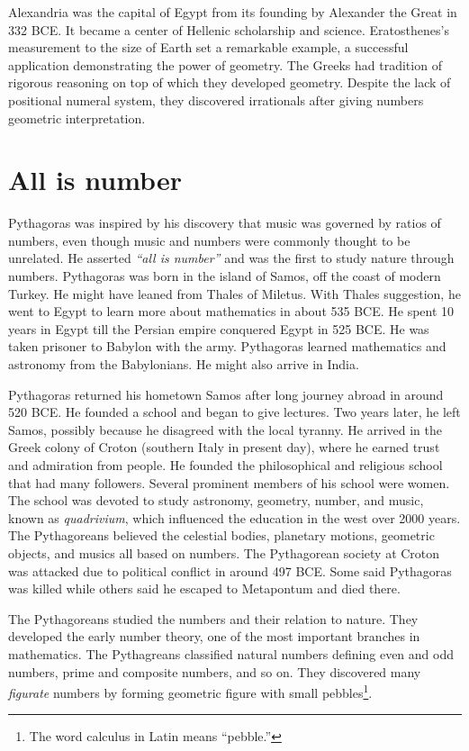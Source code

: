 \documentclass[b5paper]{article}
\begin{document}
Alexandria was the capital of Egypt from its founding by Alexander the Great in 332 BCE. It became a center of Hellenic scholarship and science. Eratosthenes's measurement to the size of Earth set a remarkable example, a successful application demonstrating the power of geometry. The Greeks had tradition of rigorous reasoning on top of which they developed geometry. Despite the lack of positional numeral system, they discovered irrationals after giving numbers geometric interpretation.

\section{All is number}
Pythagoras was inspired by his discovery that music was governed by ratios of numbers, even though music and numbers were commonly thought to be unrelated. He asserted \emph{\enquote{all is number}} and was the first to study nature through numbers. Pythagoras was born in the island of Samos, off the coast of modern Turkey. He might have leaned from Thales of Miletus. With Thales suggestion, he went to Egypt to learn more about mathematics in about 535 BCE. He spent 10 years in Egypt till the Persian empire conquered Egypt in 525 BCE. He was taken prisoner to Babylon with the army. Pythagoras learned mathematics and astronomy from the Babylonians. He might also arrive in India\cite{HanXueTao16}.

Pythagoras returned his hometown Samos after long journey abroad in around 520 BCE. He founded a school and began to give lectures. Two years later, he left Samos, possibly because he disagreed with the local tyranny. He arrived in the Greek colony of Croton (southern Italy in present day), where he earned trust and admiration from people. He founded the philosophical and religious school that had many followers. Several prominent members of his school were women. The school was devoted to study astronomy, geometry, number, and music, known as \emph{quadrivium}, which influenced the education in the west over 2000 years\cite{StepanovRose15}. The Pythagoreans believed the celestial bodies, planetary motions, geometric objects, and musics all based on numbers. The Pythagorean society at Croton was attacked due to political conflict in around 497 BCE. Some said Pythagoras was killed while others said he escaped to Metapontum and died there\cite{MKlein-1972}.

The Pythagoreans studied the numbers and their relation to nature. They developed the early number theory, one of the most important branches in mathematics. The Pythagreans classified natural numbers defining even and odd numbers, prime and composite numbers, and so on. They discovered many \emph{figurate} numbers by forming geometric figure with small pebbles\footnote{The word calculus in Latin means \enquote{pebble.}\cite{HanXueTao16}}.
\end{document}
